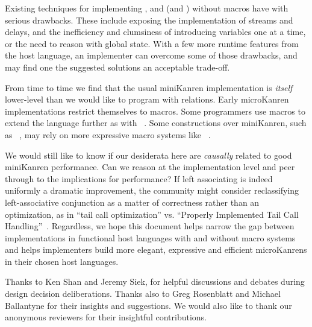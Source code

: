 \documentclass[sigplan,balance,pbalance,natbib=false]{acmart}
\begin{document}
Existing techniques for
implementing , 
and  (and ) without macros have with
serious drawbacks. These include exposing the implementation of
streams and delays, and the inefficiency and clumsiness of introducing
variables one at a time, or the need to reason with global state. With
a few more runtime features from the host language, an implementer can
overcome some of those drawbacks, and may find one the suggested
solutions an acceptable trade-off.

From time to time we find that the usual miniKanren implementation is
\emph{itself} lower-level than we would like to program with
relations. Early microKanren implementations restrict themselves
to  macros. Some programmers use macros to
extend the language further as
with ~\cite{keep2009pattern}. Some constructions
over miniKanren, such
as ~\cite{ballantyne2020macros}, may rely on
more expressive macro systems
like ~\cite{culpepper2012fortifying}.

We would still like to know if our desiderata here are \emph{causally}
related to good miniKanren performance. Can we reason at the
implementation level and peer through to the implications for
performance? If left associating  is indeed uniformly
a dramatic improvement, the community might consider reclassifying
left-associative conjunction as a matter of correctness rather than an
optimization, as in \enquote{tail call optimization} vs.
\enquote{Properly Implemented Tail Call
  Handling}~\cite{felleisen2014requestions}. Regardless, we hope this
document helps narrow the gap between implementations in functional
host languages with and without macro systems and helps implementers
build more elegant, expressive and efficient microKanrens in their
chosen host languages.

\begin{acks}

  Thanks to Ken Shan and Jeremy Siek, for helpful discussions and
  debates during design decision deliberations. Thanks also to Greg
  Rosenblatt and Michael Ballantyne for their insights and
  suggestions. We would also like to thank our anonymous reviewers
  for their insightful contributions.

\end{acks}

\printbibliography{}
\end{document}
